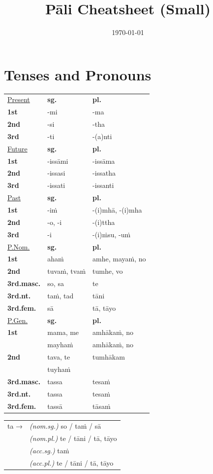 \documentclass[11pt,oneside]{memoir}
\date{\today}
\title{Pāli Cheatsheet (Small)}
\begin{document}
\chapter{Tenses and Pronouns}
\label{sec:org56d9a42}

\begin{tabular}{lll}
\uline{Present} & \textbf{sg.} & \textbf{pl.}\\
\textbf{1st} & -mi & -ma\\
\textbf{2nd} & -si & -tha\\
\textbf{3rd} & -ti & -(a)nti\\
\hline
\uline{Future} & \textbf{sg.} & \textbf{pl.}\\
\textbf{1st} & -issāmi & -issāma\\
\textbf{2nd} & -issasi & -issatha\\
\textbf{3rd} & -issati & -issanti\\
\hline
\uline{Past} & \textbf{sg.} & \textbf{pl.}\\
\textbf{1st} & -iṁ & -(i)mhā, -(i)mha\\
\textbf{2nd} & -o, -i & -(i)ttha\\
\textbf{3rd} & -i & -(i)ṁsu, -uṁ\\
\hline
\uline{P.Nom.} & \textbf{sg.} & \textbf{pl.}\\
\textbf{1st} & ahaṁ & amhe, mayaṁ, no\\
\textbf{2nd} & tuvaṁ, tvaṁ & tumhe, vo\\
\textbf{3rd.masc.} & so, sa & te\\
\textbf{3rd.nt.} & taṁ, tad & tāni\\
\textbf{3rd.fem.} & sā & tā, tāyo\\
\hline
\uline{P.Gen.} & \textbf{sg.} & \textbf{pl.}\\
\textbf{1st} & mama, me & amhākaṁ, no\\
 & mayhaṁ & amhākaṁ, no\\
\textbf{2nd} & tava, te & tumhākam\\
 & tuyhaṁ & \\
\textbf{3rd.masc.} & tassa & tesaṁ\\
\textbf{3rd.nt.} & tassa & tesaṁ\\
\textbf{3rd.fem.} & tassā & tāsaṁ\\
\end{tabular}

\begin{tabular}{ll}
ta → & \emph{(nom.sg.)} so / taṁ / sā\\
 & \emph{(nom.pl.)} te / tāni / tā, tāyo\\
 & \emph{(acc.sg.)} taṁ\\
 & \emph{(acc.pl.)}  te / tāni / tā, tāyo\\
\end{tabular}
\end{document}
